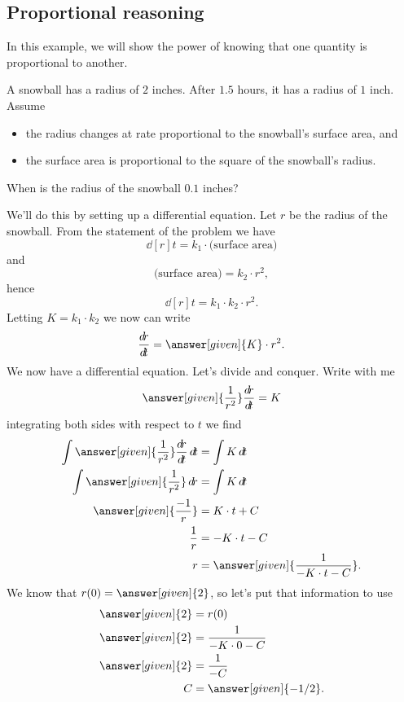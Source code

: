 \documentclass{ximera}
\begin{document}
\subsection{Proportional reasoning}

In this example, we will show the power of knowing that one quantity
is proportional to another.

\begin{example}
  A snowball has a radius of $2$ inches. After $1.5$ hours, it has a
  radius of $1$ inch. Assume
  \begin{itemize}
  \item the radius changes at rate proportional to the snowball's
    surface area, and
  \item the surface area is proportional to the square of the
    snowball's radius.
  \end{itemize}
  When is the radius of the snowball $0.1$ inches?
  \begin{explanation}
    We'll do this by setting up a differential equation. Let $r$ be
    the radius of the snowball. From the statement of the problem we
    have
    \[
    \dd[r]{t} = k_1 \cdot \text{(surface area)}
    \]
    and
    \[
    \text{(surface area)} = k_2 \cdot r^2,
    \]
    hence
    \[
    \dd[r]{t} = k_1 \cdot k_2 \cdot r^2.
    \]
    Letting $K = k_1\cdot k_2$ we now can write
    \[
    \dd[r]{t} = \answer[given]{K}\cdot r^2.
    \]
    We now have a differential equation. Let's divide and
    conquer. Write with me
    \[
    \answer[given]{\frac{1}{r^2}}\dd[r]{t} = K
    \]
    integrating both sides with respect to $t$ we find
    \begin{align*}
      \int \answer[given]{\frac{1}{r^2}}\dd[r]{t}\d t &= \int K \d t\\
      \int \answer[given]{\frac{1}{r^2}}\d r &= \int K \d t\\
      \answer[given]{\frac{-1}{r}} &= K\cdot t+C\\
      \frac{1}{r} &= -K\cdot t- C\\
      r &=\answer[given]{\frac{1}{-K\cdot t- C}}.
    \end{align*}
    We know that $r(0) = \answer[given]{2}$, so let's put that information to use
    \begin{align*}
      \answer[given]{2} &= r(0)\\
      \answer[given]{2} &= \frac{1}{-K\cdot 0- C}\\
      \answer[given]{2} &= \frac{1}{- C}\\
      C &= \answer[given]{-1/2}.

\end{align*}
\end{explanation}
\end{example}
\end{document}
